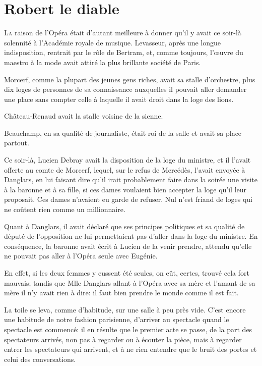\chapter{Robert le diable}

\lettrine{L}{a} raison de l'Opéra était d'autant meilleure à donner qu'il y avait ce soir-là solennité à l'Académie royale de musique. Levasseur, après une longue indisposition, rentrait par le rôle de Bertram, et, comme toujours, l'œuvre du maestro à la mode avait attiré la plus brillante société de Paris. 

Morcerf, comme la plupart des jeunes gens riches, avait sa stalle d'orchestre, plus dix loges de personnes de sa connaissance auxquelles il pouvait aller demander une place sans compter celle à laquelle il avait droit dans la loge des lions. 

Château-Renaud avait la stalle voisine de la sienne. 

Beauchamp, en sa qualité de journaliste, était roi de la salle et avait sa place partout. 

Ce soir-là, Lucien Debray avait la disposition de la loge du ministre, et il l'avait offerte au comte de Morcerf, lequel, sur le refus de Mercédès, l'avait envoyée à Danglars, en lui faisant dire qu'il irait probablement faire dans la soirée une visite à la baronne et à sa fille, si ces dames voulaient bien accepter la loge qu'il leur proposait. Ces dames n'avaient eu garde de refuser. Nul n'est friand de loges qui ne coûtent rien comme un millionnaire. 

Quant à Danglars, il avait déclaré que ses principes politiques et sa qualité de député de l'opposition ne lui permettaient pas d'aller dans la loge du ministre. En conséquence, la baronne avait écrit à Lucien de la venir prendre, attendu qu'elle ne pouvait pas aller à l'Opéra seule avec Eugénie. 

En effet, si les deux femmes y eussent été seules, on eût, certes, trouvé cela fort mauvais; tandis que Mlle Danglars allant à l'Opéra avec sa mère et l'amant de sa mère il n'y avait rien à dire: il faut bien prendre le monde comme il est fait. 

La toile se leva, comme d'habitude, sur une salle à peu près vide. C'est encore une habitude de notre fashion parisienne, d'arriver au spectacle quand le spectacle est commencé: il en résulte que le premier acte se passe, de la part des spectateurs arrivés, non pas à regarder ou à écouter la pièce, mais à regarder entrer les spectateurs qui arrivent, et à ne rien entendre que le bruit des portes et celui des conversations. 

